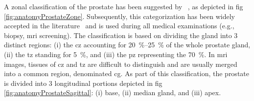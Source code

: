 A zonal classification of the prostate has been suggested by \citeauthor{McNeal1981}~\cite{McNeal1981}, as depicted in \acs{fig}\,\ref{fig:anatomyProstateZone}.
Subsequently, this categorization has been widely accepted in the literature~\cite{Hricak1987,Villers1991,Coakley2000,Parfait2010} and is used during all medical examinations (e.g., biopsy, \ac{mri} screening).
The classification is based on dividing the gland into 3 distinct regions: (i) the \ac{cz} accounting for \SIrange{20}{25}{\percent} of the whole prostate gland, (ii) the \ac{tz} standing for \SI{5}{\percent}, and (iii) the \ac{pz} representing the \SI{70}{\percent}.
In \ac{mri} images, tissues of \ac{cz} and \ac{tz} are difficult to distinguish and are usually merged into a common region, denominated \ac{cg}.
As part of this classification, the prostate is divided into 3 longitudinal portions depicted in \acs{fig}\,\ref{fig:anatomyProstateSagittal}: (i) base, (ii) median gland, and (iii) apex.






